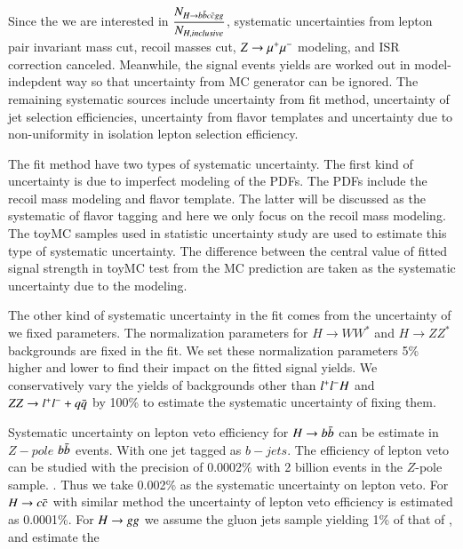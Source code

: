 \par
Since the we are interested in $\dfrac{N_{H\rightarrow b\bar{b}c\bar{c}gg}}{N_{H,inclusive}}$, systematic uncertainties from lepton pair invariant mass cut, recoil 
masses cut, $Z\rightarrow\mu^{+}\mu^{-}$ modeling, and ISR correction canceled. Meanwhile, the signal events yields are worked out in model-indepdent way so that uncertainty from MC generator can be ignored. 
The remaining systematic sources include uncertainty from fit method, uncertainty of jet selection efficiencies, uncertainty from flavor templates and uncertainty due to non-uniformity 
in isolation lepton selection efficiency.\par
The fit method have two types of systematic uncertainty. The first kind of uncertainty is due to imperfect modeling of the PDFs. 
The PDFs include the recoil mass modeling and flavor template. The latter will be 
discussed as the systematic of flavor tagging and here we only focus on the 
recoil mass modeling.
The toyMC samples used in statistic uncertainty study are used to estimate this type of systematic uncertainty. 
The difference between the central value of fitted signal strength in toyMC test from the MC prediction are taken as the systematic uncertainty due to the modeling.\par
The other kind of systematic uncertainty in the fit comes from the uncertainty of we fixed parameters.
 The normalization parameters for $H\to WW^*$ 
 and $H\to ZZ^*$ backgrounds are fixed in the fit. We set these normalization parameters  5\% higher and lower to find their impact on the fitted signal yields. 
 We conservatively vary the yields of backgrounds other than $l^{+}l^{-}H$ and $ZZ\rightarrow l^{+}l^{-}+q\bar{q}$ by 100\% to estimate the systematic uncertainty of fixing them.  
\par
Systematic uncertainty on lepton veto efficiency for $H\rightarrow b\bar{b}$ can be estimate in $Z-pole$ $b\bar{b}$ events. With one jet tagged as $b-jets$. The efficiency of lepton veto can be studied with the precision of 0.0002\% with 2 billion \bpair events in the $Z$-pole sample.
. Thus we take 0.002\% as the systematic uncertainty on lepton veto. For $H\rightarrow c\bar{c}$ with similar method the uncertainty of lepton veto efficiency is estimated as 0.0001\%. For $H\rightarrow gg$ we assume the gluon jets sample yielding 1\% of that of \bpair, and estimate the 
